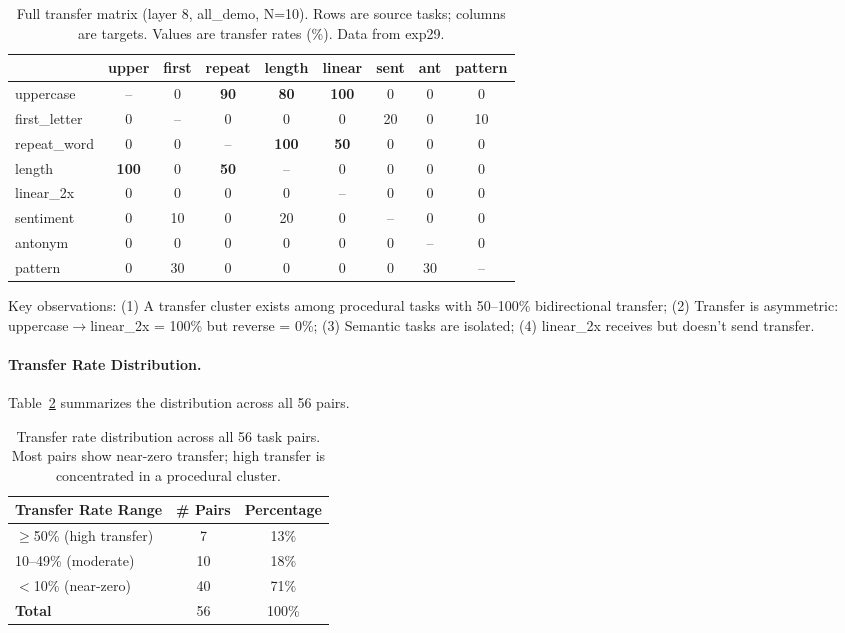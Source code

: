\documentclass{article}
\begin{document}
\begin{table}[h]
\centering
\small
\caption{Full transfer matrix (layer 8, all\_demo, N=10). Rows are source tasks; columns are targets. Values are transfer rates (\%). Data from exp29.}
\label{tab:full_transfer}
\begin{tabular}{@{}lcccccccc@{}}
\toprule
& upper & first & repeat & length & linear & sent & ant & pattern \\
\midrule
uppercase & -- & 0 & \textbf{90} & \textbf{80} & \textbf{100} & 0 & 0 & 0 \\
first\_letter & 0 & -- & 0 & 0 & 0 & 20 & 0 & 10 \\
repeat\_word & 0 & 0 & -- & \textbf{100} & \textbf{50} & 0 & 0 & 0 \\
length & \textbf{100} & 0 & \textbf{50} & -- & 0 & 0 & 0 & 0 \\
linear\_2x & 0 & 0 & 0 & 0 & -- & 0 & 0 & 0 \\
sentiment & 0 & 10 & 0 & 20 & 0 & -- & 0 & 0 \\
antonym & 0 & 0 & 0 & 0 & 0 & 0 & -- & 0 \\
pattern & 0 & 30 & 0 & 0 & 0 & 0 & 30 & -- \\
\bottomrule
\end{tabular}
\end{table}

Key observations: (1) A transfer cluster exists among procedural tasks with 50--100\% bidirectional transfer; (2) Transfer is asymmetric: uppercase$\to$linear\_2x = 100\% but reverse = 0\%; (3) Semantic tasks are isolated; (4) linear\_2x receives but doesn't send transfer.

\paragraph{Transfer Rate Distribution.} Table~\ref{tab:transfer_dist} summarizes the distribution across all 56 pairs.

\begin{table}[h]
\centering
\small
\caption{Transfer rate distribution across all 56 task pairs. Most pairs show near-zero transfer; high transfer is concentrated in a procedural cluster.}
\label{tab:transfer_dist}
\begin{tabular}{@{}lcc@{}}
\toprule
Transfer Rate Range & \# Pairs & Percentage \\
\midrule
$\geq$50\% (high transfer) & 7 & 13\% \\
10--49\% (moderate) & 10 & 18\% \\
$<$10\% (near-zero) & 40 & 71\% \\
\midrule
\textbf{Total} & 56 & 100\% \\
\bottomrule
\end{tabular}
\end{table}
\end{document}
